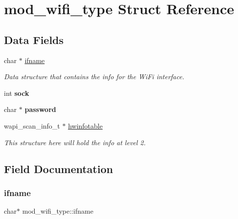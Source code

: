 \hypertarget{structmod__wifi__type}{}\section{mod\+\_\+wifi\+\_\+type Struct Reference}
\label{structmod__wifi__type}
\subsection*{Data Fields}
\begin{DoxyCompactItemize}
\item 
char $\ast$ \hyperlink{structmod__wifi__type_ac27853c3b9a91e8c439d91a8729da282}{ifname}
\begin{DoxyCompactList}\small\item\em Data structure that contains the info for the Wi\+Fi interface. \end{DoxyCompactList}\item 
\mbox{\label{structmod__wifi__type_acbd982150e5ee10fd6bf6ec541007180}} 
int {\bfseries sock}
\item 
\mbox{\label{structmod__wifi__type_a78a6eb92892921dfd60231e4ed63e59d}} 
char $\ast$ {\bfseries password}
\item 
\mbox{\label{structmod__wifi__type_a8b5e6a86a12ee7577599b6f2c071dfae}} 
wapi\+\_\+scan\+\_\+info\+\_\+t $\ast$ \hyperlink{structmod__wifi__type_a8b5e6a86a12ee7577599b6f2c071dfae}{hwinfotable}
\begin{DoxyCompactList}\small\item\em This structure here will hold the info at level 2. \end{DoxyCompactList}\end{DoxyCompactItemize}


\subsection{Field Documentation}
\mbox{\label{structmod__wifi__type_ac27853c3b9a91e8c439d91a8729da282}} 
\subsubsection{\texorpdfstring{ifname}{ifname}}
{\footnotesize\ttfamily char$\ast$ mod\+\_\+wifi\+\_\+type\+::ifname}




